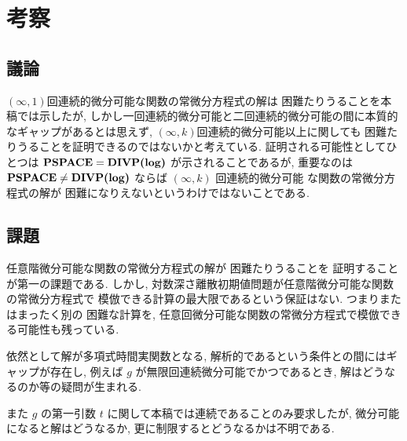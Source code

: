 \section{考察}


\subsection{議論}
$(\infty, 1)$回連続的微分可能な関数の常微分方程式の解は \PSPACE 困難たりうることを本稿では示したが,
しかし一回連続的微分可能と二回連続的微分可能の間に本質的なギャップがあるとは思えず,
$(\infty, k)$回連続的微分可能以上に関しても \PSPACE 困難たりうることを証明できるのではないかと考えている.
証明される可能性としてひとつは ${\bf PSPACE} = \text{\bf DIVP(log)}$ が示されることであるが,
重要なのは ${\bf PSPACE} \not = \text{\bf DIVP(log)}$ ならば $(\infty, k)$ 回連続的微分可能
な関数の常微分方程式の解が \PSPACE 困難になりえないというわけではないことである.


\subsection{課題}

任意階微分可能な関数の常微分方程式の解が \PSPACE 困難たりうることを
証明することが第一の課題である.
しかし, 対数深さ離散初期値問題が任意階微分可能な関数の常微分方程式で
模倣できる計算の最大限であるという保証はない.
つまりまたはまったく別の \PSPACE 困難な計算を,
任意回微分可能な関数の常微分方程式で模倣できる可能性も残っている.

依然として解が多項式時間実関数となる, 解析的であるという条件との間にはギャップが存在し,
例えば $g$ が無限回連続微分可能でかつであるとき, 解はどうなるのか等の疑問が生まれる.

また $g$ の第一引数 $t$ に関して本稿では連続であることのみ要求したが,
微分可能になると解はどうなるか, 更に制限するとどうなるかは不明である.



